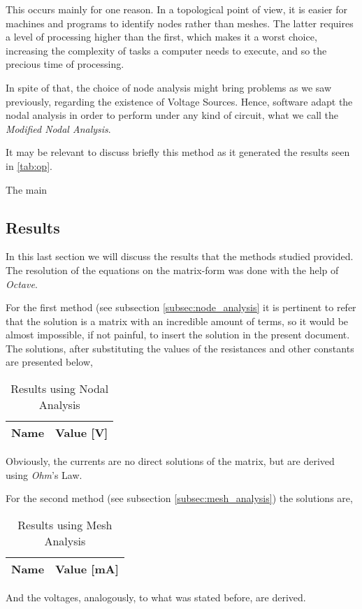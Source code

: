 This occurs mainly for one reason. In a topological point of view, it is easier for machines and programs to identify nodes rather than meshes. The latter requires a level of processing higher than the first, which makes it a worst choice, increasing the complexity of tasks a computer needs to execute, and so the precious time of processing.

In spite of that, the choice of node analysis might bring problems as we saw previously, regarding the existence of Voltage Sources. Hence, software adapt the nodal analysis in order to perform under any kind of circuit, what we call the \textit{Modified Nodal Analysis}.
 
It may be relevant to discuss briefly this method as it generated the results seen in \ref{tab:op}.

The main 

\subsection{Results}

In this last section we will discuss the results that the methods studied provided. The resolution of the equations on the matrix-form was done with the help of \textit{Octave}. 

For the first method (see subsection \ref{subsec:node_analysis} it is pertinent to refer that the solution is a matrix with an incredible amount of terms, so it would be almost impossible, if not painful, to insert the solution in the present document. 
The solutions, after substituting the values of the resistances and other constants are presented below,

\pagebreak
\begin{table}[h]
  \centering
  \begin{tabular}{|l|r|}
    \hline    
    {\bf Name} & {\bf Value [V]} \\ \hline
    
  \end{tabular}
  \caption[Results using Nodal Analysis]{Results using Nodal Analysis}
  \label{tab:nodal}
\end{table}

Obviously, the currents are no direct solutions of the matrix, but are derived using \textit{Ohm}'s Law.

For the second method (see subsection \ref{subsec:mesh_analysis}) the solutions are,

\begin{table}[h]
  \centering
  \begin{tabular}{|l|r|}
    \hline    
    {\bf Name} & {\bf Value [mA]} \\ \hline
    
  \end{tabular}
  \caption[Results using Mesh Analysis]{Results using Mesh Analysis}
  \label{tab:mesh}
\end{table}

And the voltages, analogously, to what was stated before, are derived. 

\clearpage
